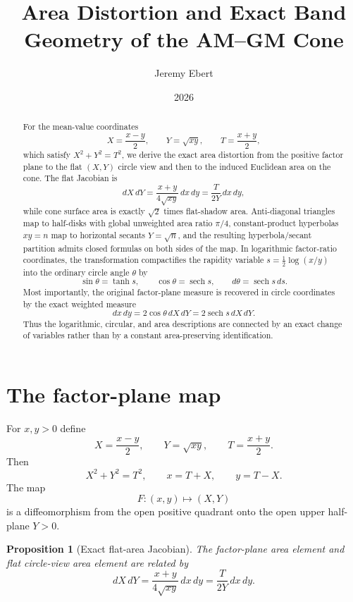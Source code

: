 \documentclass[11pt]{amsart}
\title{Area Distortion and Exact Band Geometry of the AM--GM Cone}
\author{Jeremy Ebert}
\date{2026}
\newtheorem{proposition}{Proposition}
\theoremstyle{remark}
\begin{document}
\maketitle

\begin{abstract}
For the mean-value coordinates
\[
X=\frac{x-y}{2},\qquad Y=\sqrt{xy},\qquad T=\frac{x+y}{2},
\]
which satisfy $X^2+Y^2=T^2$, we derive the exact area distortion from the positive factor plane to the flat $(X,Y)$ circle view and then to the induced Euclidean area on the cone. The flat Jacobian is
\[
dX\,dY=\frac{x+y}{4\sqrt{xy}}\,dx\,dy=\frac{T}{2Y}\,dx\,dy,
\]
while cone surface area is exactly $\sqrt2$ times flat-shadow area. Anti-diagonal triangles map to half-disks with global unweighted area ratio $\pi/4$, constant-product hyperbolas $xy=n$ map to horizontal secants $Y=\sqrt n$, and the resulting hyperbola/secant partition admits closed formulas on both sides of the map. In logarithmic factor-ratio coordinates, the transformation compactifies the rapidity variable $s=\tfrac12\log(x/y)$ into the ordinary circle angle $\theta$ by
\[
\sin\theta=\tanh s,\qquad \cos\theta=\operatorname{sech}s,\qquad d\theta=\operatorname{sech}s\,ds.
\]
Most importantly, the original factor-plane measure is recovered in circle coordinates by the exact weighted measure
\[
dx\,dy=2\cos\theta\,dX\,dY=2\operatorname{sech}s\,dX\,dY.
\]
Thus the logarithmic, circular, and area descriptions are connected by an exact change of variables rather than by a constant area-preserving identification.
\end{abstract}

\section{The factor-plane map}
For $x,y>0$ define
\begin{equation}
X=\frac{x-y}{2},\qquad Y=\sqrt{xy},\qquad T=\frac{x+y}{2}. \tag{1}
\end{equation}
Then
\begin{equation}
X^2+Y^2=T^2,\qquad x=T+X,\qquad y=T-X. \tag{2}
\end{equation}
The map
\[
F:(x,y)\longmapsto(X,Y)
\]
is a diffeomorphism from the open positive quadrant onto the open upper half-plane $Y>0$.

\begin{proposition}[Exact flat-area Jacobian]\label{prop:flatjac}
The factor-plane area element and flat circle-view area element are related by
\begin{equation}
\boxed{
 dX\,dY=\frac{x+y}{4\sqrt{xy}}\,dx\,dy
 =\frac{T}{2Y}\,dx\,dy.}
\tag{3}
\end{equation}
\end{proposition}
\end{document}
